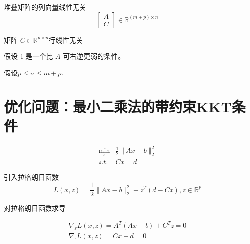 \begin{proposition}
    \label{prop:assumption-1}

    堆叠矩阵的列向量线性无关
$$
\left[\begin{array}{l}
A \\
C
\end{array}\right] \in \mathbb{R}^{(m+p) \times n}
$$
\end{proposition}

\begin{proposition}
    \label{prop:assumption-2}
    矩阵 $ C \in \mathbb{R}^{p \times n} $行线性无关

\end{proposition}

假设 1 是一个比 $ A $ 可右逆更弱的条件。 

假设$ p \leq n \leq m+p $.

\section{优化问题：最小二乘法的带约束KKT条件}

\begin{problem}
    $$\begin{aligned}
        \min _{x} & \frac{1}{2}\|A x-b\|_{2}^{2}\\
        s.t. & C x=d
    \end{aligned}$$
\end{problem}


引入拉格朗日函数
$$
L(x, z)=\frac{1}{2}\|A x-b\|_{2}^{2}-z^{T}(d-C x), z \in \mathbb{R}^{p}
$$

对拉格朗日函数求导


\begin{equation}
    \label{eqn:kkt-deriavative}
    \begin{array}{l}
\nabla_{x} L(x, z)=A^{T}(A x-b)+C^{T} z=0 \\
\nabla_{z} L(x, z)=C x-d=0
\end{array}
\end{equation}



